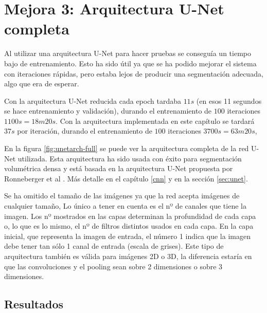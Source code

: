 \chapter{Mejora 3: Arquitectura U-Net completa}\label{full_unet}

Al utilizar una arquitectura U-Net para hacer pruebas se conseguía un tiempo bajo de entrenamiento. Esto ha sido útil ya que se ha podido mejorar el sistema con iteraciones rápidas, pero estaba lejos de producir una segmentación adecuada, algo que era de esperar.

Con la arquitectura U-Net reducida cada epoch tardaba $11s$ (en esos 11 segundos se hace entrenamiento y validación), durando el entrenamiento de $100$ iteraciones $1100s = 18m20s$. Con la arquitectura implementada en este capítulo se tardará $37s$ por iteración, durando el entrenamiento de $100$ iteraciones $3700s = 63m20s$, 

En la figura \ref{fig:unetarch-full} se puede ver la arquitectura completa de la red U-Net utilizada. Esta arquitectura ha sido usada con éxito para segmentación volumétrica densa \cite{Cicek2016} y está basada en la arquitectura U-Net propuesta por Ronneberger et al \cite{Ronneberger2015}. Más detalle en el capítulo \ref{cnn} y en la sección \ref{sec:unet}.

Se ha omitido el tamaño de las imágenes ya que la red acepta imágenes de cualquier tamaño, Lo único a tener en cuenta es el nº de canales que tiene la imagen. Los nº mostrados en las capas determinan la profundidad de cada capa o, lo que es lo mismo, el nº de filtros distintos usados en cada capa. En la capa inicial, que representa la imagen de entrada, el número 1 indica que la imagen debe tener tan sólo 1 canal de entrada (escala de grises). Este tipo de arquitectura también es válida para imágenes 2D o 3D, la diferencia estaría en que las convoluciones y el pooling sean sobre 2 dimensiones o sobre 3 dimensiones.


\section{Resultados}\label{sec:full_unet_resultados}


